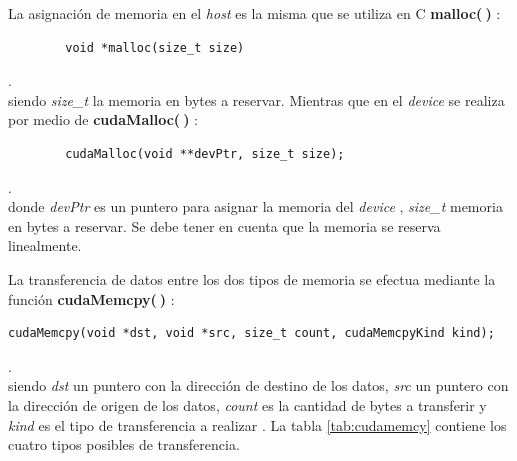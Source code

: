 La asignación de memoria en el \textit{host} es la misma que se utiliza en \textsc{C}  \textbf{malloc($\>$)} :
{\footnotesize
	\begin{frame}{}
		\begin{lstlisting}
		void *malloc(size_t size)
		\end{lstlisting}
		
	\end{frame}
}.
\\
siendo \textit{size\_t} la memoria en bytes a reservar. Mientras que en el \textit{device} se realiza por medio de \textbf{cudaMalloc($\>$)} :
\\
{\footnotesize
\begin{frame}{}
	\begin{lstlisting}
		cudaMalloc(void **devPtr, size_t size);
	\end{lstlisting}

\end{frame}
}.
\\
donde \textit{devPtr} es un puntero para asignar la memoria del \textit{device} , \textit{size\_t} memoria en bytes a reservar. Se debe tener en cuenta que la memoria se reserva linealmente.

La transferencia de datos entre los dos tipos de memoria se efectua mediante la función \textbf{cudaMemcpy($\>$)} :
{\footnotesize
\begin{frame}{}
	\begin{lstlisting}
cudaMemcpy(void *dst, void *src, size_t count, cudaMemcpyKind kind);
	\end{lstlisting}
	
\end{frame}
}.
\\
siendo \textit{dst} un puntero con la dirección de destino de los datos, \textit{src} un puntero con la dirección de origen de los datos, \textit{count} es la cantidad de bytes a transferir y \textit{kind} es el tipo de transferencia a realizar \cite{zone2020cuda}. La tabla \ref{tab:cudamemcy} contiene los cuatro tipos posibles de transferencia.


